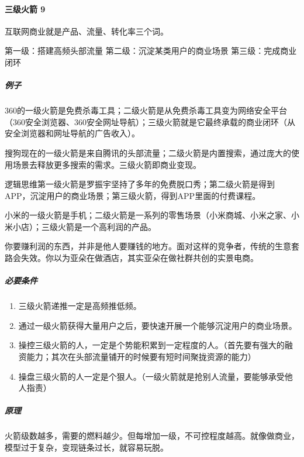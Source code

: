 \documentclass[letterpaper,11pt,english]{sphinxmanual}
\begin{document}
\paragraph{三级火箭 9\sphinxfootnotemark[346]}
\label{\detokenize{chapter_idea/business:id24}}%
\begin{footnotetext}[346]\sphinxAtStartFootnote
{}
%
\end{footnotetext}\ignorespaces 
互联网商业就是产品、流量、转化率三个词。

第一级：搭建高频头部流量 第二级：沉淀某类用户的商业场景
第三级：完成商业闭环


\subparagraph{例子}
\label{\detokenize{chapter_idea/business:id25}}
360的一级火箭是免费杀毒工具；二级火箭是从免费杀毒工具变为网络安全平台（360安全浏览器、360安全网址导航）；三级火箭就是它最终承载的商业闭环（从安全浏览器和网址导航的广告收入）。

搜狗现在的一级火箭是来自腾讯的头部流量；二级火箭是内置搜索，通过庞大的使用场景去释放更多搜索的需求。三级火箭即商业变现。

逻辑思维第一级火箭是罗振宇坚持了多年的免费脱口秀；第二级火箭是得到APP，沉淀用户的商业场景；第三级火箭，得到APP里面的付费课程。

小米的一级火箭是手机；二级火箭是一系列的零售场景（小米商城、小米之家、小米小店）；三级火箭是一个高利润的产品。

你要赚利润的东西，并非是他人要赚钱的地方。面对这样的竞争者，传统的生意套路会失效。你以为亚朵在做酒店，其实亚朵在做社群共创的实景电商。


\subparagraph{必要条件}
\label{\detokenize{chapter_idea/business:id26}}\begin{enumerate}
%
\item {} 
三级火箭递推一定是高频推低频。

\item {} 
通过一级火箭获得大量用户之后，要快速开展一个能够沉淀用户的商业场景。

\item {} 
操控三级火箭的人，一定是个势能积累到一定程度的人。（首先要有强大的融资能力；其次在头部流量铺开的时候要有短时间聚拢资源的能力）

\item {} 
操盘三级火箭的人一定是个狠人。（一级火箭就是抢别人流量，要能够承受他人指责）

\end{enumerate}


\subparagraph{原理}
\label{\detokenize{chapter_idea/business:id27}}
火箭级数越多，需要的燃料越少。但每增加一级，不可控程度越高。就像做商业，模型过于复杂，变现链条过长，就容易玩脱。
\end{document}

